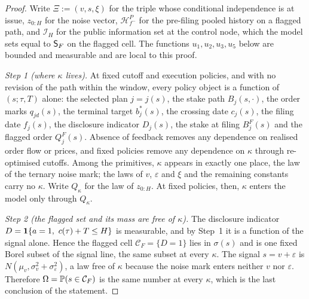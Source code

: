 \begin{proof}
Write $\Xi:=(v,s,\xi)$ for the triple whose conditional independence is at issue, $z_{0:H}$ for the
noise vector, $\mathcal H_{f^-}^P$ for the pre-filing pooled history on a flagged path, and
$\mathcal I_H$ for the public information set at the control node, which the model sets equal to
$\mathsf{S}_F$ on the flagged cell. The functions $u_1,u_2,u_3,u_5$ below are bounded and measurable and are
local to this proof.

\emph{Step 1 (where $\kappa$ lives).} At fixed cutoff and execution policies, and with no revision of
the path within the window, every policy object is a function of $(s;\tau,T)$ alone: the selected
plan $j=j(s)$, the stake path $B_j(s,\cdot)$, the order marks $q_{jd}(s)$, the terminal target
$b_j^*(s)$, the crossing date $c_j(s)$, the filing date $f_j(s)$, the disclosure indicator $D_j(s)$,
the stake at filing $B_j^F(s)$ and the flagged order $Q_j^F(s)$. Absence of feedback removes any
dependence on realised order flow or prices, and fixed policies remove any dependence on $\kappa$
through re-optimised cutoffs. Among the primitives, $\kappa$ appears in exactly one place, the law of
the ternary noise mark; the laws of $v$, $\varepsilon$ and $\xi$ and the remaining constants carry no
$\kappa$. Write $Q_\kappa$ for the law of $z_{0:H}$. At fixed policies, then, $\kappa$ enters the
model only through $Q_\kappa$.

\emph{Step 2 (the flagged set and its mass are free of $\kappa$).} The disclosure indicator
$D=\ind\{a=1,\ c(\tau)+T\le H\}$ is measurable, and by Step~1 it is a function of the signal alone.
Hence the flagged cell $\mathcal C_F=\{D=1\}$ lies in $\sigma(s)$ and is one fixed Borel subset of
the signal line, the same subset at every $\kappa$. The signal $s=v+\varepsilon$ is
$N(\mu_v,\sigma_v^2+\sigma_\varepsilon^2)$, a law free of $\kappa$ because the noise mark enters
neither $v$ nor $\varepsilon$. Therefore $\Omega=\mathbb{P}(s\in\mathcal C_F)$ is the same number at every
$\kappa$, which is the last conclusion of the statement.


\end{proof}
